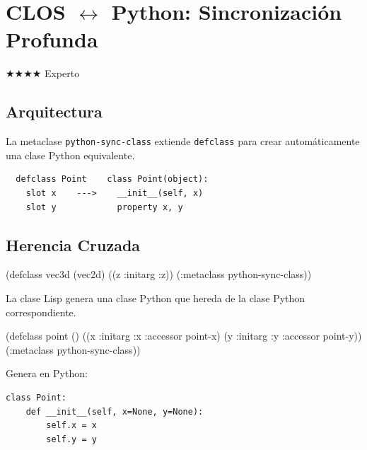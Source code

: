 \chapter{CLOS $\leftrightarrow$ Python: Sincronización Profunda}
\label{chap:clos-python-sync}
{\huge$\bigstar$}{\huge$\bigstar$}{\huge$\bigstar$}{\huge$\bigstar$} Experto

\section{Arquitectura}
La metaclase \texttt{python-sync-class} extiende \texttt{defclass} para crear
automáticamente una clase Python equivalente.

\begin{verbatim}
  defclass Point    class Point(object):
    slot x    --->    __init__(self, x)
    slot y            property x, y
\end{verbatim}

\section{Herencia Cruzada}
\begin{lispcode}
(defclass vec3d (vec2d) ((z :initarg :z)) (:metaclass python-sync-class))
\end{lispcode}
La clase Lisp genera una clase Python que hereda de la clase Python
correspondiente.

\begin{examplebox}[title=Mapeo conceptual]
\begin{lispcode}
(defclass point ()
  ((x :initarg :x :accessor point-x)
   (y :initarg :y :accessor point-y))
  (:metaclass python-sync-class))
\end{lispcode}
Genera en Python:
\begin{verbatim}
class Point:
    def __init__(self, x=None, y=None):
        self.x = x
        self.y = y
\end{verbatim}
\end{examplebox}

